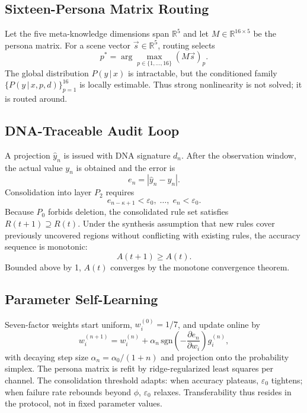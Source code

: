 \documentclass[10pt,a4paper]{article}
\theoremstyle{definition}
\begin{document}
\subsection{Sixteen-Persona Matrix Routing}

Let the five meta-knowledge dimensions span $\mathbb{R}^5$ and let $M\in\mathbb{R}^{16\times 5}$ be the persona matrix. For a scene vector $\vec{s}\in\mathbb{R}^5$, routing selects
\begin{equation}\label{eq:persona-route}
p^* = \arg\max_{p\in\{1,\dots,16\}} (M\vec{s})_p.
\end{equation}
The global distribution $P(y\,|\,x)$ is intractable, but the conditioned family $\{P(y\,|\,x,p,d)\}_{p=1}^{16}$ is locally estimable. Thus strong nonlinearity is not solved; it is routed around.

\subsection{DNA-Traceable Audit Loop}

A projection $\hat{y}_n$ is issued with DNA signature $d_n$. After the observation window, the actual value $y_n$ is obtained and the error is
\begin{equation}\label{eq:error}
e_n = |\hat{y}_n - y_n|.
\end{equation}
Consolidation into layer $P_2$ requires
\begin{equation}\label{eq:consolidation}
e_{n-\kappa+1}<\varepsilon_0,\;\dots,\;e_n<\varepsilon_0.
\end{equation}
Because $P_0$ forbids deletion, the consolidated rule set satisfies $R(t+1)\supseteq R(t)$. Under the synthesis assumption that new rules cover previously uncovered regions without conflicting with existing rules, the accuracy sequence is monotonic:
\begin{equation}\label{eq:monotonic}
A(t+1) \ge A(t).
\end{equation}
Bounded above by 1, $A(t)$ converges by the monotone convergence theorem.

\subsection{Parameter Self-Learning}

Seven-factor weights start uniform, $w_i^{(0)}=1/7$, and update online by
\begin{equation}\label{eq:weight-update}
w_i^{(n+1)} = w_i^{(n)} + \alpha_n\,\mathrm{sgn}\!\left(-\frac{\partial e_n}{\partial w_i}\right) g_i^{(n)},
\end{equation}
with decaying step size $\alpha_n=\alpha_0/(1+n)$ and projection onto the probability simplex. The persona matrix is refit by ridge-regularized least squares per channel. The consolidation threshold adapts: when accuracy plateaus, $\varepsilon_0$ tightens; when failure rate rebounds beyond $\phi$, $\varepsilon_0$ relaxes. Transferability thus resides in the protocol, not in fixed parameter values.
\end{document}
